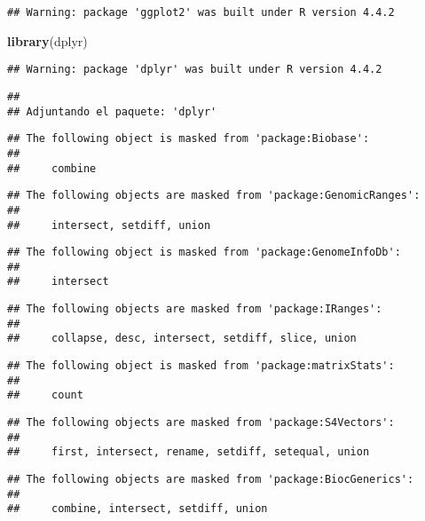\documentclass[
]{article}
\newenvironment{Shaded}{\begin{snugshade}}{\end{snugshade}}
\newcommand{\FunctionTok}[1]{\textcolor[rgb]{0.13,0.29,0.53}{\textbf{#1}}}
\newcommand{\NormalTok}[1]{#1}
\begin{document}
\begin{verbatim}
## Warning: package 'ggplot2' was built under R version 4.4.2
\end{verbatim}

\begin{Shaded}
\begin{Highlighting}[]
\FunctionTok{library}\NormalTok{(dplyr)}
\end{Highlighting}
\end{Shaded}

\begin{verbatim}
## Warning: package 'dplyr' was built under R version 4.4.2
\end{verbatim}

\begin{verbatim}
## 
## Adjuntando el paquete: 'dplyr'
\end{verbatim}

\begin{verbatim}
## The following object is masked from 'package:Biobase':
## 
##     combine
\end{verbatim}

\begin{verbatim}
## The following objects are masked from 'package:GenomicRanges':
## 
##     intersect, setdiff, union
\end{verbatim}

\begin{verbatim}
## The following object is masked from 'package:GenomeInfoDb':
## 
##     intersect
\end{verbatim}

\begin{verbatim}
## The following objects are masked from 'package:IRanges':
## 
##     collapse, desc, intersect, setdiff, slice, union
\end{verbatim}

\begin{verbatim}
## The following object is masked from 'package:matrixStats':
## 
##     count
\end{verbatim}

\begin{verbatim}
## The following objects are masked from 'package:S4Vectors':
## 
##     first, intersect, rename, setdiff, setequal, union
\end{verbatim}

\begin{verbatim}
## The following objects are masked from 'package:BiocGenerics':
## 
##     combine, intersect, setdiff, union
\end{verbatim}
\end{document}
